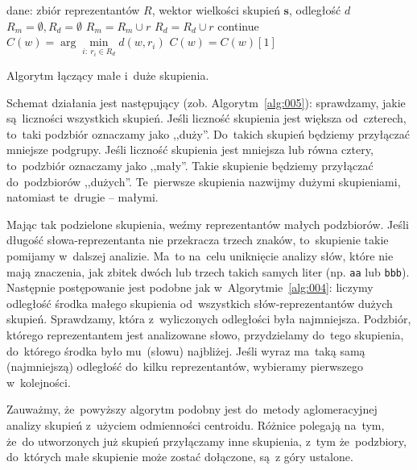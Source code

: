 \documentclass{praca1}
\begin{document}
\begin{algorithm}[h!]
\begin{algorithmic}[1]
		\State dane: zbiór reprezentantów $R$, wektor wielkości skupień $\mathbf{s}$, odległość $d$
		\State $R_m = \emptyset, R_d = \emptyset$
				\State $R_m = R_m \cup r$
			\Else
				\State $R_d = R_d \cup r$
			\EndIf
		\EndFor
        		\State continue
        	\EndIf
            \State $C(w) = \arg\min\limits_{i:\ r_i \in R_d} d(w,r_i)$
            	\State $C(w) = C(w)[1]$
            \EndIf
       \EndFor
\end{algorithmic}
\caption{Algorytm łączący małe i~duże skupienia.}\label{alg:005}
\end{algorithm}

Schemat działania jest następujący (zob. Algorytm~\ref{alg:005}): sprawdzamy, jakie są~liczności wszystkich skupień. Jeśli liczność skupienia jest większa od~czterech, to~taki podzbiór oznaczamy jako ,,duży''. Do~takich skupień będziemy przyłączać mniejsze podgrupy. Jeśli liczność skupienia jest mniejsza lub równa cztery, to~podzbiór oznaczamy jako ,,mały''. Takie skupienie będziemy przyłączać do~podzbiorów ,,dużych''. Te~pierwsze skupienia nazwijmy dużymi skupieniami, natomiast te~drugie -- małymi. 

Mając tak podzielone skupienia, weźmy reprezentantów małych podzbiorów. Jeśli długość słowa-reprezentanta nie przekracza trzech znaków, to~skupienie takie pomijamy w~dalszej analizie. Ma~to na~celu uniknięcie analizy słów, które nie mają znaczenia, jak zbitek dwóch lub trzech takich samych liter (np. \verb|aa| lub \verb|bbb|). Następnie postępowanie jest podobne jak w~Algorytmie~\ref{alg:004}: liczymy odległość środka małego skupienia od~wszystkich słów-reprezentantów dużych skupień. Sprawdzamy, która z~wyliczonych odległości była najmniejsza. Podzbiór, którego reprezentantem jest analizowane słowo, przydzielamy do~tego skupienia, do~którego środka było mu~(słowu) najbliżej. Jeśli wyraz ma~taką samą (najmniejszą) odległość do~kilku reprezentantów, wybieramy pierwszego w~kolejności.

Zauważmy, że~powyższy algorytm podobny jest do~metody aglomeracyjnej analizy skupień z~użyciem odmienności centroidu. Różnice polegają na~tym, że~do utworzonych już skupień przyłączamy inne skupienia, z~tym że~podzbiory, do~których małe skupienie może zostać dołączone, są~z góry ustalone.
\end{document}

